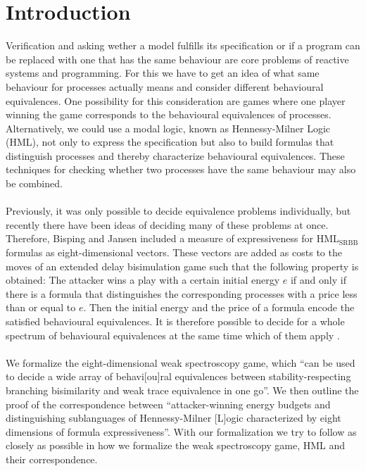 \newpage
\section{Introduction} 
Verification and asking wether a model fulfills its specification or if a program can be replaced with one that has the same behaviour are core problems of reactive systems and programming.
For this we have to get an idea of what same behaviour for processes actually means and consider different behavioural equivalences.
One possibility for this consideration are games where one player winning the game corresponds to the behavioural equivalences of processes.
Alternatively, we could use a modal logic, known as Hennessy-Milner Logic (HML), not only to express the specification but also to build formulas that distinguish processes and 
thereby characterize behavioural equivalences.
These techniques for checking whether two processes have the same behaviour may also be combined.
\\\\
Previously, it was only possible to decide equivalence problems individually, but recently there have been ideas of deciding many of these problems at once.
Therefore, Bisping and Jansen \cite{bisping2023lineartimebranchingtime} included a measure of expressiveness for HML$_\text{{SRBB}}$ formulas as eight-dimensional vectors.
These vectors are added as costs to the moves of an extended delay bisimulation game such that the following property is obtained: 
The attacker wins a play with a certain initial energy $e$ if and only if there is a formula that distinguishes the corresponding processes with a price less than or equal to $e$.
Then the initial energy and the price of a formula encode the satisfied behavioural equivalences.
It is therefore possible to decide for a whole spectrum of behavioural equivalences at the same time which of them apply \cite{bisping2023lineartimebranchingtime}.
\\\\
We formalize the eight-dimensional weak spectroscopy game, 
which ``can be used to decide a wide array of behavi[ou]ral equivalences between stability-respecting branching bisimilarity and weak trace equivalence in one go''\cite[Abstract]{bisping2023lineartimebranchingtime}.
We then outline the proof of the correspondence between ``attacker-winning energy budgets and distinguishing sublanguages of Hennessy-Milner [L]ogic characterized by eight dimensions of formula expressiveness''\cite[Abstract]{bisping2023lineartimebranchingtime}.
With our formalization we try to follow \cite{bisping2023lineartimebranchingtime} as closely as possible in how we formalize the weak spectroscopy game, HML and their correspondence.
